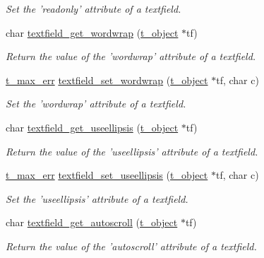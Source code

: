 \begin{DoxyCompactItemize}
\begin{DoxyCompactList}\small\item\em Set the 'readonly' attribute of a textfield. \item\end{DoxyCompactList}\item 
char \hyperlink{group__textfield_ga8e978f15933a5209063a30c5925a21ff}{textfield\_\-get\_\-wordwrap} (\hyperlink{structt__object}{t\_\-object} $\ast$tf)
\begin{DoxyCompactList}\small\item\em Return the value of the 'wordwrap' attribute of a textfield. \item\end{DoxyCompactList}\item 
\hyperlink{group__datatypes_ga73edaae82b318855cc09fac994918165}{t\_\-max\_\-err} \hyperlink{group__textfield_ga4777e4c3fc3b1c5aa7ddc319e5b2ed8e}{textfield\_\-set\_\-wordwrap} (\hyperlink{structt__object}{t\_\-object} $\ast$tf, char c)
\begin{DoxyCompactList}\small\item\em Set the 'wordwrap' attribute of a textfield. \item\end{DoxyCompactList}\item 
char \hyperlink{group__textfield_gaecee9184f75ab309ac993e4fb9d233d0}{textfield\_\-get\_\-useellipsis} (\hyperlink{structt__object}{t\_\-object} $\ast$tf)
\begin{DoxyCompactList}\small\item\em Return the value of the 'useellipsis' attribute of a textfield. \item\end{DoxyCompactList}\item 
\hyperlink{group__datatypes_ga73edaae82b318855cc09fac994918165}{t\_\-max\_\-err} \hyperlink{group__textfield_ga797da5c445484ea732cf378190795ac5}{textfield\_\-set\_\-useellipsis} (\hyperlink{structt__object}{t\_\-object} $\ast$tf, char c)
\begin{DoxyCompactList}\small\item\em Set the 'useellipsis' attribute of a textfield. \item\end{DoxyCompactList}\item 
char \hyperlink{group__textfield_ga44071d73524732acc603e99602b88494}{textfield\_\-get\_\-autoscroll} (\hyperlink{structt__object}{t\_\-object} $\ast$tf)
\begin{DoxyCompactList}\small\item\em Return the value of the 'autoscroll' attribute of a textfield. \item\end{DoxyCompactList}\item 

\end{DoxyCompactItemize}
